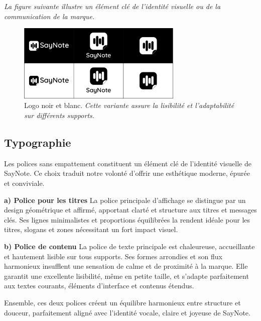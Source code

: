 \noindent
\textit{La figure suivante illustre un élément clé de l'identité visuelle ou de la communication de la marque.}
\begin{figure}[H]
    \centering
    \includegraphics[width=0.7\textwidth]{docs/visual-indentity/pictures/logo-variation-black-and-white.jpg}
    \caption{Logo noir et blanc. \newline\textit{Cette variante assure la lisibilité et l'adaptabilité sur différents supports.}}
\end{figure}

\subsection{Typographie}
Les polices sans empattement constituent un élément clé de l’identité visuelle de SayNote. Ce choix traduit notre volonté d’offrir une esthétique moderne, épurée et conviviale.

\textbf{a) Police pour les titres}
La police principale d’affichage se distingue par un design géométrique et affirmé, apportant clarté et structure aux titres et messages clés. Ses lignes minimalistes et proportions équilibrées la rendent idéale pour les titres, slogans et zones nécessitant un fort impact visuel.

\textbf{b) Police de contenu}
La police de texte principale est chaleureuse, accueillante et hautement lisible sur tous supports. Ses formes arrondies et son flux harmonieux insufflent une sensation de calme et de proximité à la marque. Elle garantit une excellente lisibilité, même en petite taille, et s’adapte parfaitement aux textes courants, éléments d’interface et contenus étendus.

Ensemble, ces deux polices créent un équilibre harmonieux entre structure et douceur, parfaitement aligné avec l’identité vocale, claire et joyeuse de SayNote.

